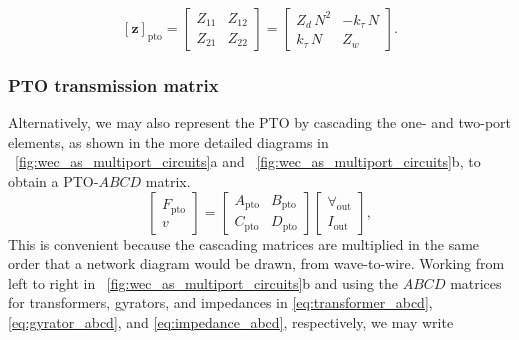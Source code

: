 \documentclass[twocolumn]{autart}
\begin{document}
\begin{equation}
        \left[ \mathbf{z} \right]_{\textrm{pto}} 
        = 
        \begin{bmatrix} 
                Z_{11} & Z_{12} \\ 
                Z_{21} & Z_{22} 
        \end{bmatrix}
        =
        \begin{bmatrix} 
        Z_d \, N^2      & -k_\tau \, N  \\
        k_\tau \, N     & Z_w
        \end{bmatrix}.
        \label{eq:pto_impedance}
\end{equation}

\subsubsection{PTO transmission matrix}\label{sec:pto_transmission_matrix}
Alternatively, we may also represent the PTO by cascading the one- and two-port elements, as shown in the more detailed diagrams in \figurename~\ref{fig:wec_as_multiport_circuits}a and \figurename~\ref{fig:wec_as_multiport_circuits}b, to obtain a PTO-$ABCD$ matrix.
%
\begin{equation}
	\label{eq:pto_ABCD_mat_def}
	\begin{bmatrix} 
		F_{\textrm{pto}} \\
		v 
	\end{bmatrix} 
	= 
        \begin{bmatrix} 
	A_{\textrm{pto}} & B_{\textrm{pto}} \\ 
	C_{\textrm{pto}} & D_{\textrm{pto}} 
        \end{bmatrix}
	\begin{bmatrix} 
		\forall_{\textrm{out}} \\
		I_{\textrm{out}} 
	\end{bmatrix},
\end{equation}
%
This is convenient because the cascading matrices are multiplied in the same order that a network diagram would be drawn, from wave-to-wire.
Working from left to right in \figurename~\ref{fig:wec_as_multiport_circuits}b and using the $ABCD$ matrices for transformers, gyrators, and impedances in \eqref{eq:transformer_abcd}, \eqref{eq:gyrator_abcd}, and \eqref{eq:impedance_abcd}, respectively, we may write 
%
\end{document}
